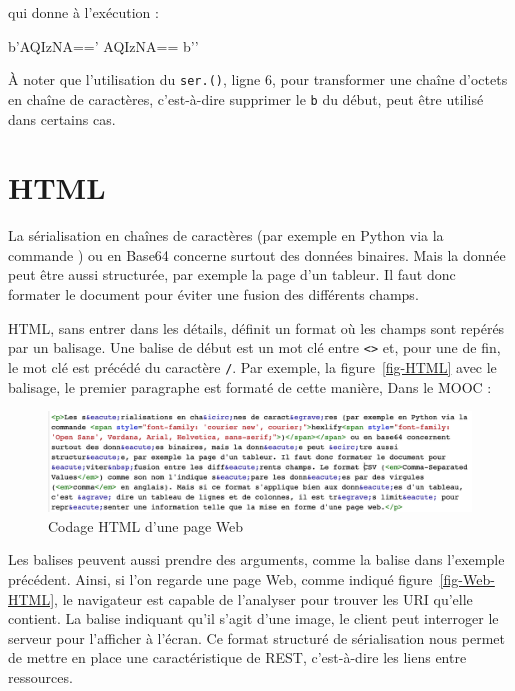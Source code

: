 qui donne à l’exécution :

\begin{termc}[backgroundcolor=\color{backcolour}]
b'AQIzNA=='
AQIzNA==
b''
\end{termc}

À noter que l'utilisation du \texttt{ser.()}, ligne 6, pour transformer une chaîne d'octets en chaîne de caractères, c'est-à-dire supprimer le \texttt{b} du début, peut être utilisé dans certains cas.



\section{HTML}

La sérialisation en chaînes de caractères (par exemple en Python via la commande ) ou en Base64 concerne surtout des données binaires. Mais la donnée peut être aussi structurée, par exemple la page d'un tableur. Il faut donc formater le document pour éviter une fusion des différents champs.


\ac{HTML}, sans entrer dans les détails, définit un format où les champs sont repérés par un balisage.  Une balise de début est un mot clé entre \texttt{<>} et, pour une  de fin, le mot clé est précédé du caractère \texttt{/}. Par exemple, la figure~\vref{fig-HTML} avec le balisage, le premier paragraphe est formaté de cette manière, Dans le MOOC :

\begin{figure}[tbp]
\centerline{\includegraphics[width=1\columnwidth]{Pictures/Capture22.png}}
\caption{Codage HTML d'une page Web}
\label{fig-HTML}
\end{figure}

Les balises peuvent aussi prendre des arguments, comme la balise  dans l'exemple précédent. Ainsi, si l'on regarde une page Web, comme indiqué figure~\vref{fig-Web-HTML}, le navigateur est capable de l'analyser pour trouver les \ac{URI} qu'elle contient. La balise \texttt{} indiquant qu'il s'agit d'une image, le client peut interroger le serveur pour l'afficher à l'écran. Ce format structuré de sérialisation nous permet de mettre en place une caractéristique de \ac{REST}, c'est-à-dire les liens entre ressources.

